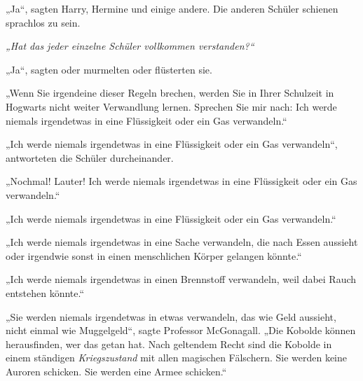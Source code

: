 „Ja“, sagten Harry, Hermine und einige andere. Die anderen Schüler schienen sprachlos zu sein. 

\emph{„Hat das jeder einzelne Schüler vollkommen verstanden?“} 

„Ja“, sagten oder murmelten oder flüsterten sie. 

„Wenn Sie irgendeine dieser Regeln brechen, werden Sie in Ihrer Schulzeit in Hogwarts nicht weiter Verwandlung lernen. Sprechen Sie mir nach: Ich werde niemals irgendetwas in eine Flüssigkeit oder ein Gas verwandeln.“ 

„Ich werde niemals irgendetwas in eine Flüssigkeit oder ein Gas verwandeln“, antworteten die Schüler durcheinander. 

„Nochmal! Lauter! Ich werde niemals irgendetwas in eine Flüssigkeit oder ein Gas verwandeln.“ 

„Ich werde niemals irgendetwas in eine Flüssigkeit oder ein Gas verwandeln.“ 

„Ich werde niemals irgendetwas in eine Sache verwandeln, die nach Essen aussieht oder irgendwie sonst in einen menschlichen Körper gelangen könnte.“ 

„Ich werde niemals irgendetwas in einen Brennstoff verwandeln, weil dabei Rauch entstehen könnte.“ 

„Sie werden niemals irgendetwas in etwas verwandeln, das wie Geld aussieht, nicht einmal wie Muggelgeld“, sagte Professor McGonagall. „Die Kobolde können herausfinden, wer das getan hat. Nach geltendem Recht sind die Kobolde in einem ständigen \emph{Kriegszustand} mit allen magischen Fälschern. Sie werden keine Auroren schicken. Sie werden eine Armee schicken.“ 

